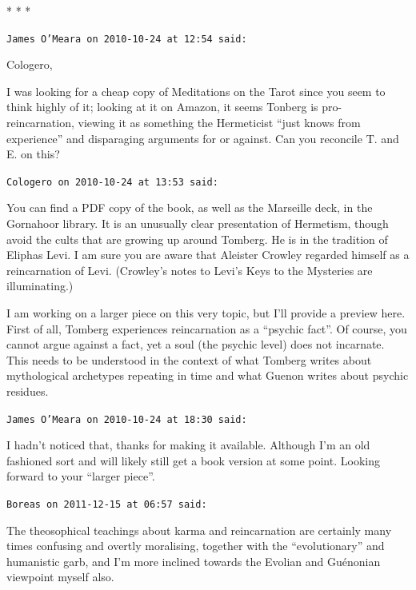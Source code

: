 
\begin{center}* * *\end{center}

\begin{footnotesize}
\begin{sffamily}
\texttt{James O'Meara on 2010-10-24 at 12:54 said:}

Cologero,

I was looking for a cheap copy of Meditations on the Tarot since you seem to think highly of it; looking at it on Amazon, it seems Tonberg is pro-reincarnation, viewing it as something the Hermeticist ``just knows from experience'' and disparaging arguments for or against. Can you reconcile T. and E. on this?

\hfill

\texttt{Cologero on 2010-10-24 at 13:53 said:}

You can find a PDF copy of the book, as well as the Marseille deck, in the Gornahoor library. It is an unusually clear presentation of Hermetism, though avoid the cults that are growing up around Tomberg. He is in the tradition of Eliphas Levi. I am sure you are aware that Aleister Crowley regarded himself as a reincarnation of Levi. (Crowley's notes to Levi's Keys to the Mysteries are illuminating.)

I am working on a larger piece on this very topic, but I'll provide a preview here. First of all, Tomberg experiences reincarnation as a ``psychic fact''. Of course, you cannot argue against a fact, yet a soul (the psychic level) does not incarnate. This needs to be understood in the context of what Tomberg writes about mythological archetypes repeating in time and what Guenon writes about psychic residues.

\hfill

\texttt{James O'Meara on 2010-10-24 at 18:30 said:}

I hadn't noticed that, thanks for making it available. Although I'm an old fashioned sort and will likely still get a book version at some point. Looking forward to your ``larger piece''.

\hfill

\texttt{Boreas on 2011-12-15 at 06:57 said:}

The theosophical teachings about karma and reincarnation are certainly many times confusing and overtly moralising, together with the ``evolutionary'' and humanistic garb, and I'm more inclined towards the Evolian and Guénonian viewpoint myself also.


\end{sffamily}
\end{footnotesize}
